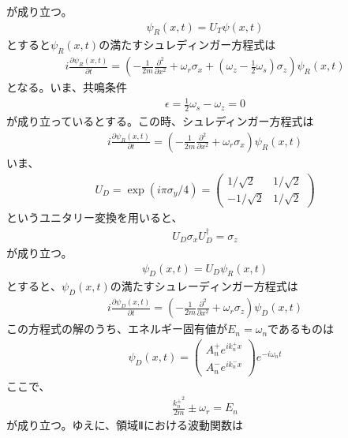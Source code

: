 が成り立つ。
\begin{align}
{\psi}_{R}(x,t)=U_{T}{\psi}(x,t)
\end{align}
$とすると{\psi}_{R}(x,t)の満たすシュレディンガー方程式は$
\begin{align}
i\frac{\partial {\psi}_{R}(x,t)}{\partial t}=\left(-\frac{1}{2m}\frac{\partial^2}{\partial x^2}+\omega_{r}{\sigma}_{x}+\left(\omega_{z}-\frac{1}{2}\omega_{s}\right){\sigma}_{z}\right){\psi}_{R}(x,t)
\end{align}
となる。いま、共鳴条件
\begin{align}
{\epsilon}=\frac{1}{2}\omega_{s}-\omega_{z}=0
\end{align}
が成り立っているとする。この時、シュレディンガー方程式は
\begin{align}
i\frac{\partial {\psi}_{R}(x,t)}{\partial t}=\left(-\frac{1}{2m}\frac{\partial^2}{\partial x^2}+\omega_{r}{\sigma}_{x}\right){\psi}_{R}(x,t)
\end{align}
いま、
\begin{align}
U_{D}=\exp(i{\pi}{\sigma}_{y}/4)=
\begin{pmatrix}
1/\sqrt{2} &1/\sqrt{2} \\
-1/\sqrt{2} &1/\sqrt{2}
\end{pmatrix}
\end{align}
というユニタリー変換を用いると、
\begin{align}
U_{D}{\sigma}_{x}U_{D}^{\dagger}={\sigma}_{z}
\end{align}
が成り立つ。
\begin{align}
{\psi}_{D}(x,t)=U_{D}{\psi}_{R}(x,t)
\end{align}
$とすると、{\psi}_{D}(x,t)の満たすシュレーディンガー方程式は$
\begin{align}
i\frac{\partial {\psi}_{D}(x,t)}{\partial t}=\left(-\frac{1}{2m}\frac{\partial^2}{\partial x^2}+\omega_{r}{\sigma}_{z}\right){\psi}_{D}(x,t)
\end{align}
$この方程式の解のうち、エネルギー固有値がE_{n}=\omega_{n}であるものは$
\begin{align}
{\psi}_{D}(x,t) =
\begin{pmatrix}
A_{n}^{+}e^{ik_{n}^{+}x}  \\
A_{n}^{-}e^{ik_{n}^{-}x}
\end{pmatrix}
e^{-i\omega_{n}t}
\end{align}
ここで、
\begin{align}
\frac{{k_{n}^{\pm}}^2}{2m}{\pm}\omega_{r}=E_{n}
\end{align}
が成り立つ。ゆえに、領域Ⅱにおける波動関数は
